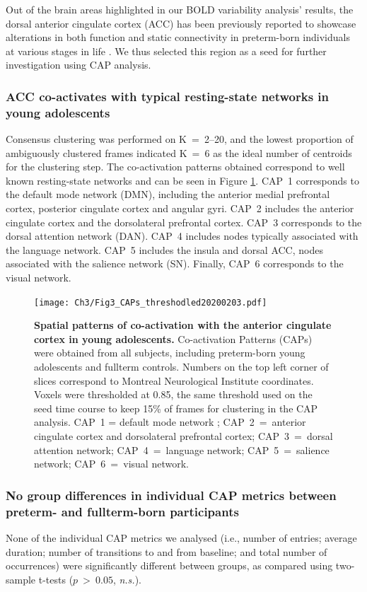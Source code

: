 Out of the brain areas highlighted in our BOLD variability analysis' results, the dorsal anterior cingulate cortex (ACC) has been previously reported to showcase alterations in both function and static connectivity in preterm-born individuals at various stages in life \citep{White2014,Daamen2015,Lordier2019}. We thus selected this region as a seed for further investigation using CAP analysis. 

\subsubsection*{ACC co-activates with typical resting-state networks in young adolescents} Consensus clustering was performed on K~=~2--20, and the lowest proportion of ambiguously clustered frames indicated K~=~6 as the ideal number of centroids for the clustering step. The co-activation patterns obtained correspond to well known resting-state networks and can be seen in Figure \ref{fig:CAPs}. CAP~1 corresponds to the default mode network (DMN), including the anterior medial prefrontal cortex, posterior cingulate cortex and angular gyri. CAP~2 includes the anterior cingulate cortex and the dorsolateral prefrontal cortex. CAP~3 corresponds to the dorsal attention network (DAN). CAP~4 includes nodes typically associated with the language network. CAP~5 includes the insula and dorsal ACC, nodes associated with the salience network (SN). Finally, CAP~6 corresponds to the visual network.


\begin{figure}[h]
\centering\texttt{[image: Ch3/Fig3\_CAPs\_threshodled20200203.pdf]}
\caption{\textbf{Spatial patterns of co-activation with the anterior cingulate cortex in young adolescents.} Co-activation Patterns (CAPs) were obtained from all subjects, including preterm-born young adolescents and fullterm controls. Numbers on the top left corner of slices correspond to Montreal Neurological Institute coordinates. Voxels were thresholded at 0.85, the same threshold used on the seed time course to keep 15\% of frames for clustering in the CAP analysis.  CAP~1 = default mode network ; CAP~2~=~anterior cingulate cortex and dorsolateral prefrontal cortex; CAP~3~=~dorsal attention network; CAP~4~=~language network; CAP~5~=~salience network; CAP~6~=~visual network.} \label{fig:CAPs}
\end{figure}




\subsubsection*{No group differences in individual CAP metrics between preterm- and fullterm-born participants} None of the individual CAP metrics we analysed (i.e.,  number of entries; average duration; number of transitions to and from baseline; and total number of occurrences) were significantly different between groups, as compared using two-sample t-tests ($p~>~0.05$, \textit{n.s.}). 

